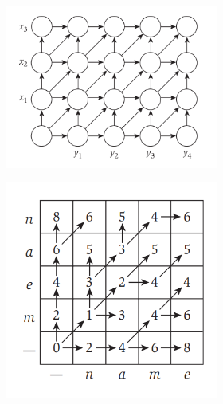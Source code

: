 \begin{figure}[H]
	\begin{subfigure}{\textwidth}
		\centering
		\begin{subfigure}{.5\textwidth}
			\centering
			\includegraphics[width=\linewidth, keepaspectratio]{capitoli/programmazione_dinamica/imgs/sa.png}
		\end{subfigure}%
		\begin{subfigure}{.5\textwidth}
			\centering
			\includegraphics[width=\linewidth, keepaspectratio]{capitoli/programmazione_dinamica/imgs/seqalignmatrix.png}
		\end{subfigure}%
	\end{subfigure}
\end{figure}

